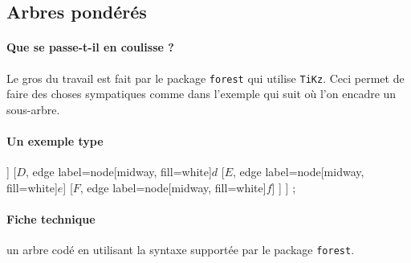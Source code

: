 \documentclass[12pt,a4paper]{article}
\begin{document}

\subsection{Arbres pondérés}

\paragraph{Que se passe-t-il en coulisse ?}

Le gros du travail est fait par le package \verb+forest+ qui utilise \verb+TiKz+. Ceci permet de faire des choses sympatiques comme dans l'exemple qui suit où l'on encadre un sous-arbre.


\paragraph{Un exemple type}

\begin{tcblisting}{}
\begin{probatree}
    [
        [$A$, name=left, edge label={node[midway, fill=white]{$a$}}
            [$B$, name=topright, edge label={node[midway, fill=white]{$b$}}]
            [$C$, name=bottomright, edge label={node[midway, fill=white]{$c$}}]
        ]
        [$D$, edge label={node[midway, fill=white]{$d$}}
            [$E$, edge label={node[midway, fill=white]{$e$}}]
            [$F$, edge label={node[midway, fill=white]{$f$}}]
        ]
    ]
    \node[draw=blue, thick, rounded corners, fit=(left)(topright)(bottomright)] {};
\end{probatree}

\end{tcblisting}


\paragraph{Fiche technique}


\Content{} un arbre codé en utilisant la syntaxe supportée par le package \verb+forest+.
\end{document}
